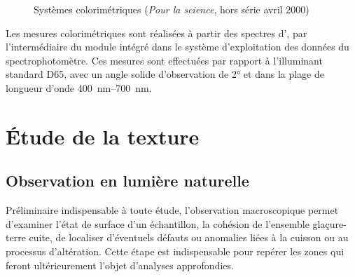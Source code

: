 \begin{figure}[htb]
{\begin{minipage}[b]{0.45\textwidth}
  \end{minipage}%
  }%
  \caption[Systèmes colorimétriques \trichros]
          {Systèmes colorimétriques \trichros (\emph{Pour la science}, 
           hors série avril 2000)}
  \label{fig:colorimetrie}
\end{figure}

Les mesures colorimétriques sont réalisées à partir des spectres 
d'\AO, par l'intermédiaire du module  intégré 
dans le système d'exploitation des données du spectrophotomètre. Ces 
mesures sont effectuées par rapport à l'illuminant standard D65, avec 
un angle solide d'observation de \ang{2} et dans la plage de longueur 
d'onde \SIrange{400}{700}{\nm}.


\section{Étude de la texture}

\subsection{Observation en lumière naturelle}
Préliminaire indispensable à toute étude, l'observation macroscopique 
permet d'examiner l'état de surface d'un échantillon, la cohésion de 
l'ensemble glaçure-terre cuite, de localiser d'éventuels défauts ou 
anomalies liées à la cuisson ou au processus d'altération. Cette étape 
est indispensable pour repérer les zones qui feront ultérieurement 
l'objet d'analyses approfondies.

